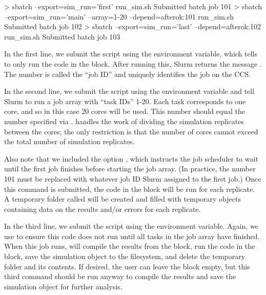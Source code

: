 \begin{example}
> sbatch --export=sim_run='first' run_sim.sh
Submitted batch job 101
> sbatch --export=sim_run='main' --array=1-20 --depend=afterok:101 run_sim.sh
Submitted batch job 102
> sbatch --export=sim_run='last' --depend=afterok:102 run_sim.sh
Submitted batch job 103
\end{example}

In the first line, we submit the  script using the  environment variable, which tells  to only run the code in the  block. After running this, Slurm returns the message . The number  is called the ``job ID'' and uniquely identifies the job on the CCS.

In the second line, we submit the  script using the  environment variable and tell Slurm to run a job array with ``task IDs'' 1-20. Each task corresponds to one core, and so in this case 20 cores will be used. This number should equal the  number specified via .  handles the work of dividing the simulation replicates between the cores; the only restriction is that the number of cores cannot exceed the total number of simulation replicates.

Also note that we included the option , which instructs the job scheduler to wait until the first job finishes before starting the job array. (In practice, the number 101 must be replaced with whatever job ID Slurm assigned to the first job.) Once this command is submitted, the code in the  block will be run for each replicate. A temporary folder called  will be created and filled with temporary objects containing data on the results and/or errors for each replicate.

In the third line, we submit the  script using the  environment variable. Again, we use  to ensure this code does not run until all tasks in the job array have finished. When this job runs,  will compile the results from the  block, run the code in the  block, save the simulation object to the filesystem, and delete the temporary  folder and its contents. If desired, the user can leave the  block empty, but this third  command should be run anyway to compile the results and save the simulation object for further analysis.

